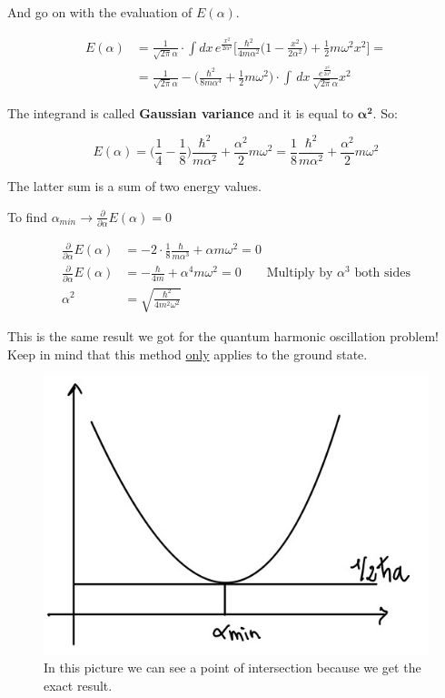 		And go on with the evaluation of $E(\alpha)$.

		\begin{align*}
			E(\alpha)&=\frac{1}{\sqrt{2\pi}\alpha}\cdot \int dx\, e^{\frac{x^2}{2\alpha^2}}\bigg[\frac{\hbar^2}{4m\alpha^2}\bigg(1-\frac{x^2}{2\alpha^2}\bigg)+\frac{1}{2}m\omega^2x^2\bigg]=\\
					 		&=\frac{1}{\sqrt{2\pi}\alpha}-\bigg(\frac{\hbar^2}{8m\alpha^4}+\frac{1}{2}m\omega^2\bigg)\cdot \int\,dx\,\frac{e^{\frac{x^2}{2\alpha^2}}}{\sqrt{2\pi}\alpha}x^2
		\end{align*}

		The integrand is called \textbf{Gaussian variance} and it is equal to $\mathbf{\alpha^2}$.
		So:

		$$E(\alpha)=\bigg(\frac{1}{4}-\frac{1}{8}\bigg)\frac{\hbar^2}{m\alpha^2}+\frac{\alpha^2}{2}m\omega^2 = \frac{1}{8}\frac{\hbar^2}{m\alpha^2}+\frac{\alpha^2}{2}m\omega^2$$

		The latter sum is a sum of two energy values.

		To find $\alpha_{min}\rightarrow\frac{\partial}{\partial \alpha}E(\alpha)=0$

		\begin{align*}
			\frac{\partial}{\partial \alpha}E(\alpha)&=-2\cdot\frac{1}{8}\frac{\hbar}{m\alpha^{3}}+\alpha m\omega^2=0\\
			\frac{\partial}{\partial \alpha}E(\alpha)&=-\frac{\hbar}{4m}+\alpha^4m\omega^2=0\qquad\text{Multiply by }\alpha^3\text{ both sides}\\
			\alpha^2&=\sqrt{\frac{\hbar^2}{4m^2\omega^2}}
		\end{align*}

		This is the same result we got for the quantum harmonic oscillation problem! Keep in mind that this method \underline{only} applies to the ground state.

		\begin{figure}[h!]
			\centering
			\includegraphics[scale=0.30]{img_4}
			\caption{In this picture we can see a point of intersection because we get the exact result.}
			\label{fig:intersect}
		\end{figure}
